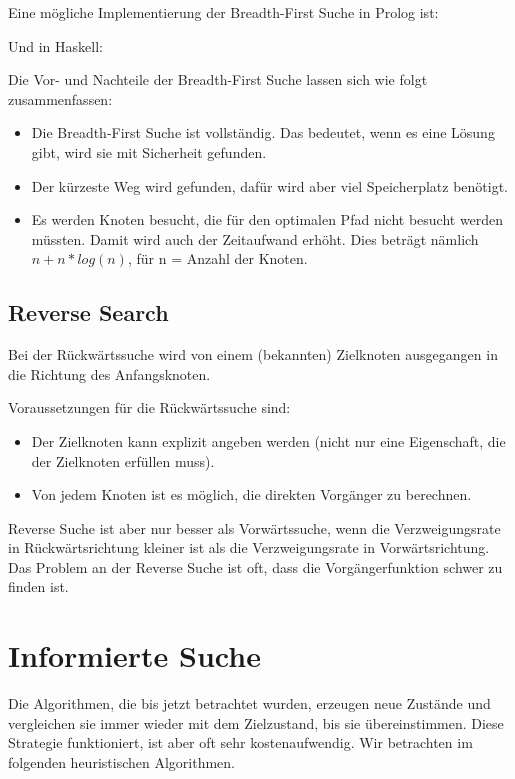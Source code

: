 Eine mögliche Implementierung der Breadth-First Suche in Prolog ist:



Und in Haskell:



Die Vor- und Nachteile der Breadth-First Suche lassen sich wie folgt zusammenfassen:

\begin{itemize}
  \item Die Breadth-First Suche ist vollständig. Das bedeutet, wenn es eine Lösung gibt, wird sie mit Sicherheit gefunden.
  \item Der kürzeste Weg wird gefunden, dafür wird aber viel Speicherplatz benötigt.
  \item Es werden Knoten besucht, die für den optimalen Pfad nicht besucht werden müssten. Damit wird auch der Zeitaufwand erhöht. Dies beträgt nämlich $n+n*log(n)$, für n = Anzahl der Knoten.
\end{itemize}

\subsection{Reverse Search}
Bei der Rückwärtssuche wird von einem (bekannten) Zielknoten ausgegangen in die Richtung des Anfangsknoten.

Voraussetzungen für die Rückwärtssuche sind:

\begin{itemize}
  \item Der Zielknoten kann explizit angeben werden (nicht nur eine Eigenschaft, die der Zielknoten erfüllen muss).
  \item Von jedem Knoten ist es möglich, die direkten Vorgänger zu berechnen.
\end{itemize}

Reverse Suche ist aber nur besser als Vorwärtssuche, wenn die Verzweigungsrate in Rückwärtsrichtung kleiner ist als die Verzweigungsrate in Vorwärtsrichtung. Das Problem an der Reverse Suche ist oft, dass die Vorgängerfunktion schwer zu finden ist.

\section{Informierte Suche}

Die Algorithmen, die bis jetzt betrachtet wurden, erzeugen neue Zustände und vergleichen sie immer wieder mit dem Zielzustand, bis sie übereinstimmen. Diese Strategie funktioniert, ist aber oft sehr kostenaufwendig. Wir betrachten im folgenden heuristischen Algorithmen.

